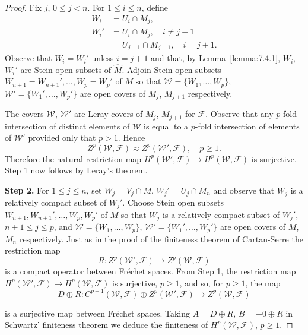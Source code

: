 \begin{proof}
Fix $j$, $0\leq j<n$. For $1\leq i\leq n$, define
\begin{align*}
W_i&=U_i\cap M_j,\\
W_i'&=U_i\cap M_j,\quad i\ne j+1\\
&=U_{j+1}\cap M_{j+1},\quad i=j+1.
\end{align*}
Observe that $W_i=W_i'$ unless $i=j+1$ and that, by Lemma~\ref{lemma:7.4.1}, $W_i$, $W_i'$ are Stein open subsets of $\widehat M$. Adjoin Stein open subsets $W_{n+1}=W_{n+1}',\ldots,W_p=W_p'$ of $M$ so that $\mathcal W=\{W_1,\ldots,W_p\}$, $\mathcal W'=\{W_1',\ldots,W_p'\}$ are open covers of $M_j$, $M_{j+1}$ respectively.
\begin{center}
    \begin{minipage}{\linewidth}
        \centering
        
    \end{minipage}
\end{center}
The covers $\mathcal W$, $\mathcal W'$ are Leray covers of $M_j$, $M_{j+1}$ for $\mathcal F$. Observe that any $p$-fold intersection of distinct elements of $\mathcal W$ is equal to a $p$-fold intersection of elements of $\mathcal W'$ provided only that $p>1$. Hence
\[
Z^p(\mathcal W,\mathcal F)\approx Z^p(\mathcal W',\mathcal F),\quad p\geq1.
\]
Therefore the natural restriction map $H^p(\mathcal W',\mathcal F)\to H^p(\mathcal W,\mathcal F)$ is surjective. Step 1 now follows by Leray's theorem.

\textbf{Step 2.} For $1\leq j\leq n$, set $W_j=V_j\cap M$, $W_j'=U_j\cap M_n$ and observe that $W_j$ is a relatively compact subset of $W_j'$. Choose Stein open subsets $W_{n+1},W_{n+1}',\ldots,W_p,W_p'$ of $M$ so that $W_j$ is a relatively compact subset of $W_j'$, $n+1\leq j\leq p$, and $\mathcal W=\{W_1,\ldots,W_p\}$, $\mathcal W'=\{W_1',\ldots,W_p'\}$ are open covers of $M$, $M_n$ respectively. Just as in the proof of the finiteness theorem of Cartan-Serre the restriction map
\[
R:Z^p(\mathcal W',\mathcal F)\to Z^p(\mathcal W,\mathcal F)
\]
is a compact operator between Fr\'echet spaces. From Step 1, the restriction map $H^p(\mathcal W',\mathcal F)\to H^p(\mathcal W,\mathcal F)$ is surjective, $p\geq1$, and so, for $p\geq1$, the map
\[
D\oplus R:C^{p-1}(\mathcal W,\mathcal F)\oplus Z^p(\mathcal W',\mathcal F)\to Z^p(\mathcal W,\mathcal F)
\]

is a surjective map between Fr\'echet spaces. Taking $A=D\oplus R$, $B=-0\oplus R$ in Schwartz' finiteness theorem we deduce the finiteness of $H^p(\mathcal W,\mathcal F)$, $p\geq1$.
\end{proof}
